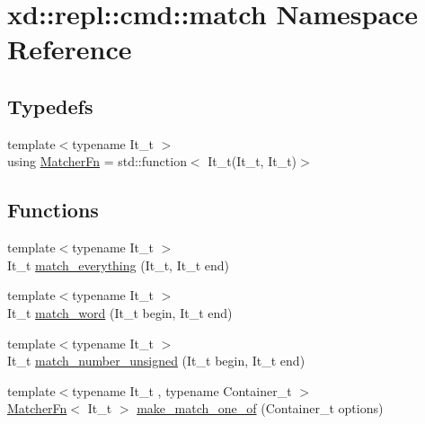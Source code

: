 \hypertarget{namespacexd_1_1repl_1_1cmd_1_1match}{}\section{xd\+:\+:repl\+:\+:cmd\+:\+:match Namespace Reference}
\label{namespacexd_1_1repl_1_1cmd_1_1match}
\subsection*{Typedefs}
\begin{DoxyCompactItemize}
\item 
{\footnotesize template$<$typename It\+\_\+t $>$ }\\using \mbox{\hyperlink{namespacexd_1_1repl_1_1cmd_1_1match_a6adaea39875cd6b9e4f84c89d8b81db8}{Matcher\+Fn}} = std\+::function$<$ It\+\_\+t(It\+\_\+t, It\+\_\+t)$>$
\end{DoxyCompactItemize}
\subsection*{Functions}
\begin{DoxyCompactItemize}
\item 
{\footnotesize template$<$typename It\+\_\+t $>$ }\\It\+\_\+t \mbox{\hyperlink{namespacexd_1_1repl_1_1cmd_1_1match_a13ea81f19011856f25359fe295871e29}{match\+\_\+everything}} (It\+\_\+t, It\+\_\+t end)
\item 
{\footnotesize template$<$typename It\+\_\+t $>$ }\\It\+\_\+t \mbox{\hyperlink{namespacexd_1_1repl_1_1cmd_1_1match_a6d03db8267a2bd0ac79c7d159cb5ad48}{match\+\_\+word}} (It\+\_\+t begin, It\+\_\+t end)
\item 
{\footnotesize template$<$typename It\+\_\+t $>$ }\\It\+\_\+t \mbox{\hyperlink{namespacexd_1_1repl_1_1cmd_1_1match_a538583c38508105d0ff00a17db2c9223}{match\+\_\+number\+\_\+unsigned}} (It\+\_\+t begin, It\+\_\+t end)
\item 
{\footnotesize template$<$typename It\+\_\+t , typename Container\+\_\+t $>$ }\\\mbox{\hyperlink{namespacexd_1_1repl_1_1cmd_1_1match_a6adaea39875cd6b9e4f84c89d8b81db8}{Matcher\+Fn}}$<$ It\+\_\+t $>$ \mbox{\hyperlink{namespacexd_1_1repl_1_1cmd_1_1match_a0a74d89ca8b41820161e905da0ddc328}{make\+\_\+match\+\_\+one\+\_\+of}} (Container\+\_\+t options)
\end{DoxyCompactItemize}


